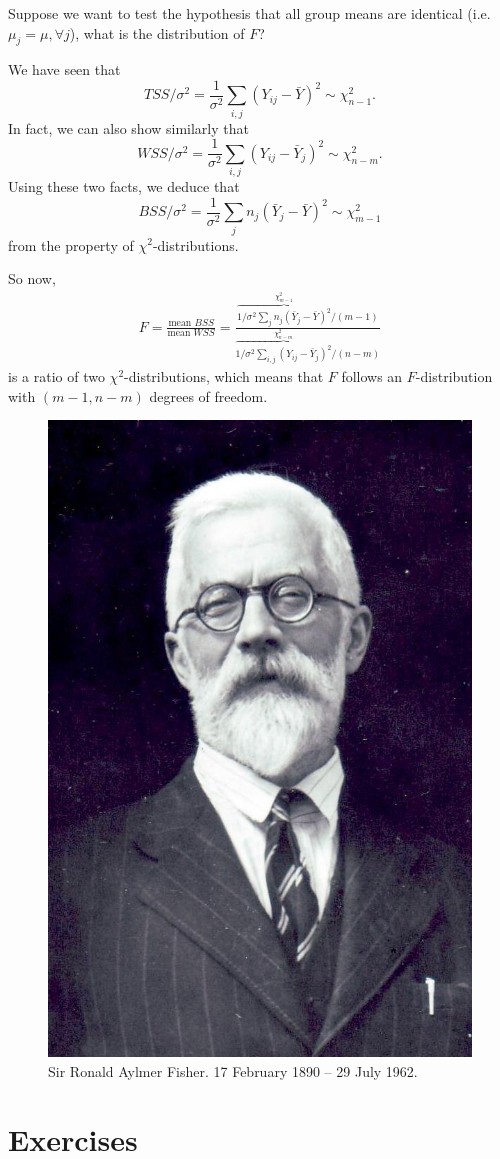 \documentclass[
]{book}
\theoremstyle{definition}
\theoremstyle{definition}
\theoremstyle{definition}
\theoremstyle{definition}
\theoremstyle{remark}
\begin{document}
Suppose we want to test the hypothesis that all group means are identical (i.e.~\(\mu_j=\mu, \forall j\)), what is the distribution of \(F\)?

We have seen that
\[TSS/\sigma^2 = \frac{1}{\sigma^2}\sum_{i,j}(Y_{ij} - \bar Y)^2 \sim \chi^2_{n-1}.\]
In fact, we can also show similarly that
\[WSS/\sigma^2 =\frac{1}{\sigma^2}\sum_{i,j} (Y_{ij} - \bar Y_j)^2 \sim \chi^2_{n-m}.\]
Using these two facts, we deduce that
\[BSS/\sigma^2=\frac{1}{\sigma^2}\sum_{j} n_j(\bar Y_j - \bar Y)^2 \sim \chi^2_{m-1}\]
from the property of \(\chi^2\)-distributions.

So now, \[\begin{aligned}
    F = \frac{\text{mean }BSS}{\text{mean }WSS} = \frac{ \overbrace{1/\sigma^2\sum_{j} n_j(\bar Y_j - \bar Y)^2}^{\chi^2_{m-1}} / (m-1)}{ \overbrace{1/\sigma^2\sum_{i,j}(Y_{ij} - \bar Y_j)^2}^{\chi^2_{n-m}} / (n-m)}
  \end{aligned}\] is a ratio of two \(\chi^2\)-distributions, which means
that \(F\) follows an \(F\)-distribution with \((m-1,n-m)\) degrees of
freedom.

\begin{figure}

{\centering \includegraphics[width=0.5\linewidth]{figure/fisher} 

}

\caption{Sir Ronald Aylmer Fisher. 17 February 1890 -- 29 July 1962.}\label{fig:fisher}
\end{figure}

\hypertarget{exercises-2}{%
\section{Exercises}\label{exercises-2}}
\end{document}
